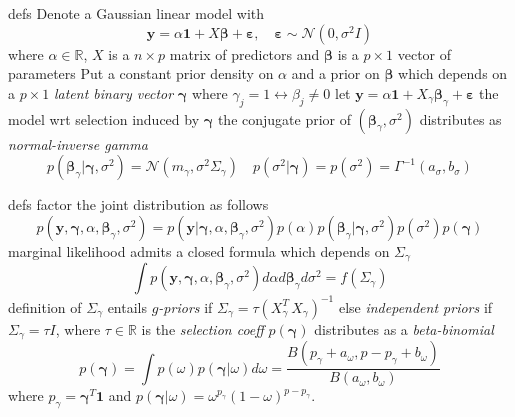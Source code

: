 \documentclass{beamer}
\newcommand{\vect}[1]{\boldsymbol{#1}}
\begin{document}
\begin{frame}{defs}
Denote a Gaussian linear model with
\begin{displaymath}
    \vect{y} = \alpha\vect{1} + X\vect{\beta} + \vect{\varepsilon},\quad\vect{\varepsilon}\sim\mathcal{N}(0, \sigma^{2}I)
\end{displaymath}
where $\alpha\in\mathbb{R}$, $X$ is a $n\times p$ matrix of predictors 
and $\vect{\beta}$ is a $p\times1$ vector of parameters
\vfill
Put a constant prior density on $\alpha$ and a prior on $\vect{\beta}$ which
depends on a $p\times1$ \emph{latent binary vector} $\vect{\gamma}$ where
$\gamma_{j}=1 \leftrightarrow \beta_{j}\neq0$
\vfill
let $\vect{y} = \alpha\vect{1} + X_{\gamma}\vect{\beta}_{\gamma} + \vect{\varepsilon}$ the model
wrt selection induced by $\vect{\gamma}$
\vfill
the conjugate prior of $(\vect{\beta}_{\gamma}, \sigma^{2})$ distributes as 
\emph{normal-inverse gamma}
\begin{displaymath}
    p(\vect{\beta}_{\gamma}|\vect{\gamma}, \sigma^{2}) = \mathcal{N}(m_{\gamma}, \sigma^{2}\Sigma_{\gamma})\quad
    p(\sigma^{2}|\vect{\gamma}) = p(\sigma^{2}) = \mathcal{\Gamma}^{-1}(a_{\sigma}, b_{\sigma})
\end{displaymath}
\end{frame}

\begin{frame}{defs}
factor the joint distribution as follows
\begin{displaymath}
    p(\vect{y}, \vect{\gamma}, \alpha, \vect{\beta}_{\gamma}, \sigma^{2}) = 
        p(\vect{y}|\vect{\gamma}, \alpha, \vect{\beta}_{\gamma}, \sigma^{2})
        p(\alpha)p(\vect{\beta}_{\gamma}|\vect{\gamma}, \sigma^{2})p(\sigma^{2})p(\vect{\gamma}) 
\end{displaymath}
\vfill
marginal likelihood admits a closed formula which depends on $\Sigma_{\gamma}$
\begin{displaymath}
    \int{p(\vect{y}, \vect{\gamma}, \alpha, \vect{\beta}_{\gamma},
    \sigma^{2})}d\alpha d\vect{\beta}_{\gamma} d\sigma^{2} = f(\Sigma_{\gamma})
\end{displaymath}
\vfill
definition of $\Sigma_{\gamma}$ entails \emph{$g$-priors} if $\Sigma_{\gamma} =
\tau \left(X_{\gamma}^{T}\,X_{\gamma}\right)^{-1}$ else \emph{independent
priors} if $\Sigma_{\gamma} = \tau I$, where $\tau\in\mathbb{R}$ is the
\emph{selection coeff}
\vfill
$p(\vect{\gamma})$ distributes as a \emph{beta-binomial}
\begin{displaymath}
p(\vect{\gamma}) = \int{p(\omega)p(\vect{\gamma}|\omega)d\omega} =
\frac{B(p_{\gamma}+a_{\omega}, p-p_{\gamma}+b_{\omega})}{B(a_{\omega},
b_{\omega})}
\end{displaymath}
where $p_{\gamma}=\vect{\gamma}^{T}\vect{1}$ and
$p(\vect{\gamma}|\omega)=\omega^{p_{\gamma}}(1-\omega)^{p-p_{\gamma}}$.
\end{frame}
\end{document}
